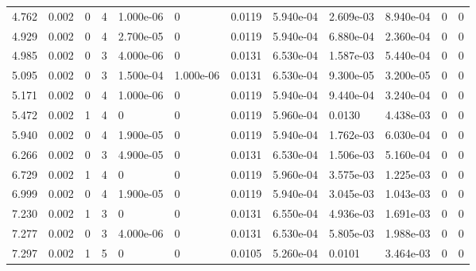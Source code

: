 \documentclass[preview]{standalone}
\begin{document}
{{\begin{tabular}{L{1.2cm}C{1.2cm} C{0.3cm}C{0.5cm} C{1.4cm}C{1.4cm} C{1.4cm}C{1.4cm} C{1.6cm}C{1.6cm} C{1.6cm}C{1.6cm}}
  4.762  &  0.002  & 0     &  4 &  1.000e-06  & 0  &  0.0119&   5.940e-04& 2.609e-03 & 8.940e-04   &  0 & 0  \\ 
  4.929  &  0.002  & 0     &  4 &  2.700e-05  & 0  &  0.0119&   5.940e-04& 6.880e-04 & 2.360e-04   &  0 & 0  \\ 
  4.985  &  0.002  & 0     &  3 &  4.000e-06  & 0  &  0.0131&   6.530e-04& 1.587e-03 & 5.440e-04   &  0 & 0  \\ 
  5.095  &  0.002  & 0     &  3 &  1.500e-04  & 1.000e-06  &  0.0131&   6.530e-04& 9.300e-05 & 3.200e-05   &  0 & 0  \\ 
  5.171  &  0.002  & 0     &  4 &  1.000e-06  & 0  &  0.0119&   5.940e-04& 9.440e-04 & 3.240e-04   &  0 & 0  \\ 
  5.472  &  0.002  & 1     &  4 &  0  & 0  &  0.0119&   5.960e-04& 0.0130 & 4.438e-03   &  0 & 0  \\ 
  5.940  &  0.002  & 0     &  4 &  1.900e-05  & 0  &  0.0119&   5.940e-04& 1.762e-03 & 6.030e-04   &  0 & 0  \\ 
  6.266  &  0.002  & 0     &  3 &  4.900e-05  & 0  &  0.0131&   6.530e-04& 1.506e-03 & 5.160e-04   &  0 & 0  \\ 
  6.729  &  0.002  & 1     &  4 &  0  & 0  &  0.0119&   5.960e-04& 3.575e-03 & 1.225e-03   &  0 & 0  \\ 
  6.999  &  0.002  & 0     &  4 &  1.900e-05  & 0  &  0.0119&   5.940e-04& 3.045e-03 & 1.043e-03   &  0 & 0  \\ 
  7.230  &  0.002  & 1     &  3 &  0  & 0  &  0.0131&   6.550e-04& 4.936e-03 & 1.691e-03   &  0 & 0  \\ 
  7.277  &  0.002  & 0     &  3 &  4.000e-06  & 0  &  0.0131&   6.530e-04& 5.805e-03 & 1.988e-03   &  0 & 0  \\ 
  7.297  &  0.002  & 1     &  5 &  0  & 0  &  0.0105&   5.260e-04& 0.0101 & 3.464e-03   &  0 & 0  \\ 
\hline 
\end{tabular} 

}}
\end{document}
